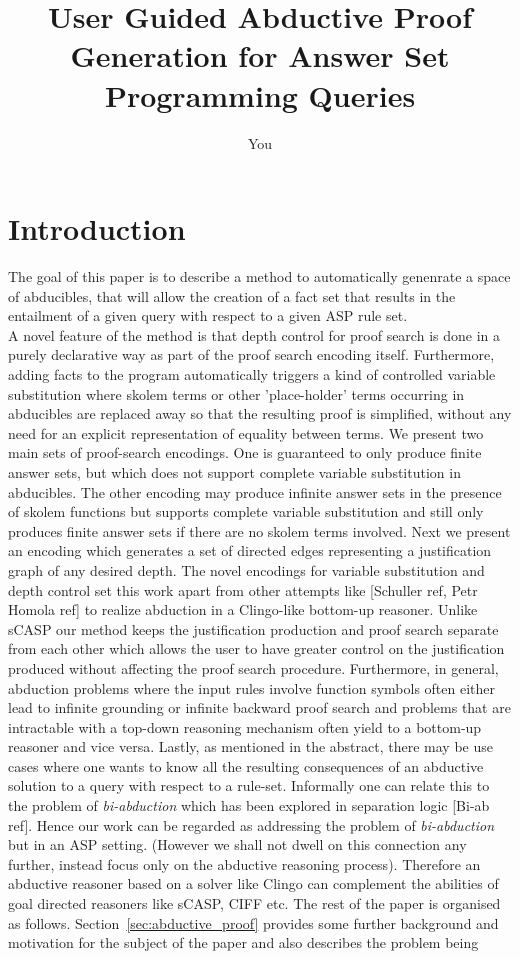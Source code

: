 \documentclass{article}
\title{User Guided Abductive Proof Generation for Answer Set Programming Queries}
\author{You}
\begin{document}
\maketitle




\section{Introduction}
The goal of this paper is to describe a method to automatically genenrate a space of abducibles, that will allow the creation of a fact set that results in the entailment of a given query with respect to a given ASP rule set. \\
\newline
A novel feature of the method is that depth control for proof search is done in a purely declarative way as part of the proof search encoding itself. Furthermore, adding facts to the program automatically triggers a kind of controlled variable substitution where skolem terms or other 'place-holder' terms occurring in abducibles are replaced away so that the resulting proof is simplified, without any need for an explicit representation of equality between terms. We present two main sets of proof-search encodings. One is guaranteed to only produce finite answer sets, but which does not support complete variable substitution in abducibles. The other encoding may produce infinite answer sets in the presence of skolem functions but supports complete variable substitution and still only produces finite answer sets if there are no skolem terms involved. Next we present an encoding which generates a set of directed edges representing a justification graph of any desired depth. The novel encodings for variable substitution and depth control set this work apart from other attempts like [Schuller ref, Petr Homola ref] to realize abduction in a Clingo-like bottom-up reasoner. Unlike sCASP our method keeps the justification production and proof search separate from each other which allows the user to have greater control on the justification produced without affecting the proof search procedure. Furthermore, in general, abduction problems where the input rules involve function symbols often either lead to infinite grounding or infinite backward proof search and problems that are intractable with a top-down reasoning mechanism often yield to a bottom-up reasoner and vice versa. Lastly, as mentioned in the abstract, there may be use cases where one wants to know all the resulting consequences of an abductive solution to a query with respect to a rule-set. Informally one can relate this to the problem of \emph{bi-abduction} which has been explored in separation logic [Bi-ab ref]. Hence our work can be regarded as addressing the problem of \emph{bi-abduction} but in an ASP setting. (However we shall not dwell on this connection any further, instead focus only on the abductive reasoning process). Therefore an abductive reasoner based on a solver like Clingo can complement the abilities of goal directed reasoners like sCASP, CIFF etc.  The rest of the paper is organised as follows. Section~\ref{sec:abductive_proof} provides some further background and motivation for the subject of the paper and also describes the problem being 
\end{document}
